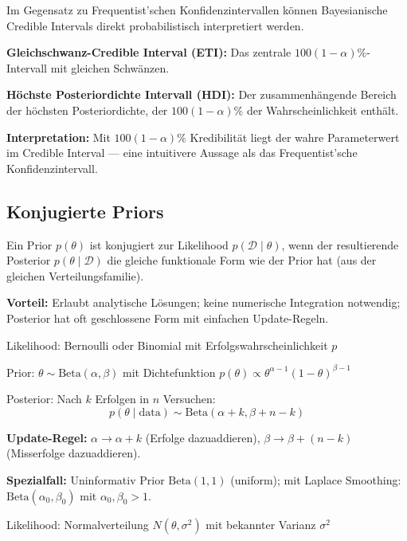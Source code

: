 Im Gegensatz zu Frequentist'schen Konfidenzintervallen können Bayesianische Credible Intervals direkt probabilistisch interpretiert werden.

\textbf{Gleichschwanz-Credible Interval (ETI):} Das zentrale $100(1-\alpha)\%$-Intervall mit gleichen Schwänzen.

\textbf{Höchste Posteriordichte Intervall (HDI):} Der zusammenhängende Bereich der höchsten Posteriordichte, der $100(1-\alpha)\%$ der Wahrscheinlichkeit enthält.

\textbf{Interpretation:} Mit $100(1-\alpha)\%$ Kredibilität liegt der wahre Parameterwert im Credible Interval — eine intuitivere Aussage als das Frequentist'sche Konfidenzintervall.

\newpage

\subsection{Konjugierte Priors}

Ein Prior $p(\theta)$ ist konjugiert zur Likelihood $p(\mathcal{D} \mid \theta)$, wenn der resultierende Posterior $p(\theta \mid \mathcal{D})$ die gleiche funktionale Form wie der Prior hat (aus der gleichen Verteilungsfamilie).

\textbf{Vorteil:} Erlaubt analytische Lösungen; keine numerische Integration notwendig; Posterior hat oft geschlossene Form mit einfachen Update-Regeln.

Likelihood: Bernoulli oder Binomial mit Erfolgswahrscheinlichkeit $p$

Prior: $\theta \sim \text{Beta}(\alpha, \beta)$ mit Dichtefunktion $p(\theta) \propto \theta^{\alpha-1} (1-\theta)^{\beta-1}$

Posterior: Nach $k$ Erfolgen in $n$ Versuchen:
$$p(\theta \mid \text{data}) \sim \text{Beta}(\alpha + k, \beta + n - k)$$

\textbf{Update-Regel:} $\alpha \to \alpha + k$ (Erfolge dazuaddieren), $\beta \to \beta + (n-k)$ (Misserfolge dazuaddieren).

\textbf{Spezialfall:} Uninformativ Prior $\text{Beta}(1, 1)$ (uniform); mit Laplace Smoothing: $\text{Beta}(\alpha_0, \beta_0)$ mit $\alpha_0, \beta_0 > 1$.

Likelihood: Normalverteilung $N(\theta, \sigma^2)$ mit bekannter Varianz $\sigma^2$

